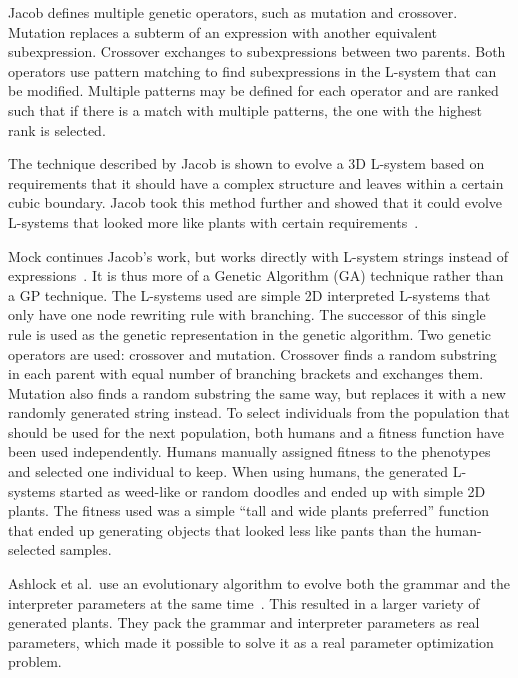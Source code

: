 Jacob defines multiple genetic operators, such as mutation and crossover.
Mutation replaces a subterm of an expression with another equivalent subexpression.
Crossover exchanges to subexpressions between two parents.
Both operators use pattern matching to find subexpressions in the L-system that can be modified.
Multiple patterns may be defined for each operator and are ranked such that if there is a match with multiple patterns, the one with the highest rank is selected.

The technique described by Jacob is shown to evolve a 3D L-system based on requirements that it should have a complex structure and leaves within a certain cubic boundary.
Jacob took this method further and showed that it could evolve L-systems that looked more like plants with certain requirements~\cite{1995Jacob,1996Jacob,1996Jacob-2}.

Mock continues Jacob's work, but works directly with L-system strings instead of expressions~\cite{1998Mock}.
It is thus more of a Genetic Algorithm (GA) technique rather than a GP technique.
The L-systems used are simple 2D interpreted L-systems that only have one node rewriting rule with branching.
The successor of this single rule is used as the genetic representation in the genetic algorithm.
Two genetic operators are used: crossover and mutation.
Crossover finds a random substring in each parent with equal number of branching brackets and exchanges them.
Mutation also finds a random substring the same way, but replaces it with a new randomly generated string instead.
To select individuals from the population that should be used for the next population, both humans and a fitness function have been used independently.
Humans manually assigned fitness to the phenotypes and selected one individual to keep.
When using humans, the generated L-systems started as weed-like or random doodles and ended up with simple 2D plants.
The fitness used was a simple ``tall and wide plants preferred'' function that ended up generating objects that looked less like pants than the human-selected samples.

Ashlock et al.\ use an evolutionary algorithm to evolve both the grammar and the interpreter parameters at the same time~\cite{2006Ashlock}.
This resulted in a larger variety of generated plants.
They pack the grammar and interpreter parameters as real parameters, which made it possible to solve it as a real parameter optimization problem.

